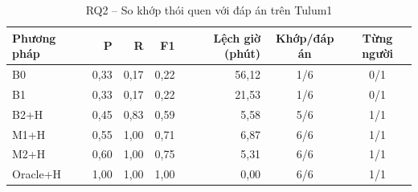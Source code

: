 \begin{table}[htbp]
\centering
\caption{RQ2 -- So khớp thói quen với đáp án trên Tulum1}
\label{tab:rq2-tulum1}
\small
\begin{tabular}{lrrrrcc}
\toprule
Phương pháp & P & R & F1 & Lệch giờ (phút) & Khớp/đáp án & Từng người \\
\midrule
B0 & 0{,}33 & 0{,}17 & 0{,}22 & 56{,}12 & 1/6 & 0/1 \\
B1 & 0{,}33 & 0{,}17 & 0{,}22 & 21{,}53 & 1/6 & 0/1 \\
B2+H & 0{,}45 & 0{,}83 & 0{,}59 & 5{,}58 & 5/6 & 1/1 \\
M1+H & 0{,}55 & 1{,}00 & 0{,}71 & 6{,}87 & 6/6 & 1/1 \\
M2+H & 0{,}60 & 1{,}00 & 0{,}75 & 5{,}31 & 6/6 & 1/1 \\
Oracle+H & 1{,}00 & 1{,}00 & 1{,}00 & 0{,}00 & 6/6 & 1/1 \\
\bottomrule
\end{tabular}
\end{table}

